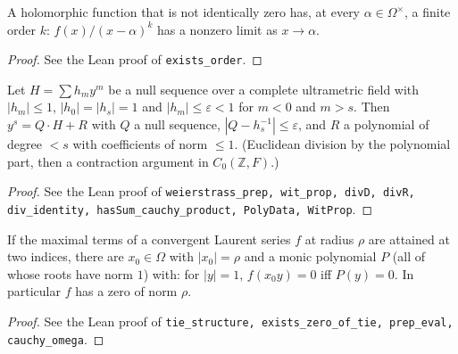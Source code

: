 \begin{proposition}
\label{prop:finite-order}
\leanok
A holomorphic function that is not identically zero has, at every $\alpha\in\Omega^\times$, a finite order $k$: $f(x)/(x-\alpha)^k$ has a nonzero limit as $x\to\alpha$.
\end{proposition}
\begin{proof}
\leanok
See the Lean proof of \texttt{exists\_order}.
\end{proof}

\begin{lemma}
\label{lem:weierstrass-prep}
\leanok
Let $H=\sum h_my^m$ be a null sequence over a complete ultrametric field with $|h_m|\le 1$, $|h_0|=|h_s|=1$ and $|h_m|\le\varepsilon<1$ for $m<0$ and $m>s$. Then $y^s=Q\cdot H+R$ with $Q$ a null sequence, $|Q-h_s^{-1}|\le\varepsilon$, and $R$ a polynomial of degree $<s$ with coefficients of norm $\le1$. (Euclidean division by the polynomial part, then a contraction argument in $C_0(\mathbb Z,F)$.)
\end{lemma}
\begin{proof}
\leanok
See the Lean proof of \texttt{weierstrass\_prep, wit\_prop, divD, divR, div\_identity, hasSum\_cauchy\_product, PolyData, WitProp}.
\end{proof}

\begin{proposition}
\label{prop:tie-structure}
\leanok
If the maximal terms of a convergent Laurent series $f$ at radius $\rho$ are attained at two indices, there are $x_0\in\Omega$ with $|x_0|=\rho$ and a monic polynomial $P$ (all of whose roots have norm $1$) with: for $|y|=1$, $f(x_0y)=0$ iff $P(y)=0$. In particular $f$ has a zero of norm $\rho$.
\end{proposition}
\begin{proof}
\leanok
See the Lean proof of \texttt{tie\_structure, exists\_zero\_of\_tie, prep\_eval, cauchy\_omega}.
\end{proof}


